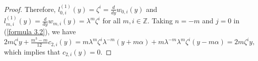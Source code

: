 \documentclass[12pt,reqno]{amsart}
\def\Z{\mathbb{Z}}
\numberwithin{equation}{section}
\begin{document}
\begin{proof}
Therefore, $l_{0,i}^{(1)}(y)=\zeta^i=\frac{d}{dy}w_{0,i}(y)$ and $l_{m,i}^{(1)}(y)=\frac{d}{dy}w_{m,i}(y)=\lambda^m\zeta^i$ for all $m,i\in\Z$. Taking $n=-m$ and $j=0$ in (\ref{formula 3.2}), we have $2m\zeta^iy+\frac{m^3-m}{12}c_{2,i}(y)=m\lambda^m\zeta^i\lambda^{-m}(y+m\alpha)+m\lambda^{-m}\lambda^{m}\zeta^i(y-m\alpha)
=2m\zeta^iy,$
which implies that $c_{2,i}(y)=0$.
\end{proof}
\end{document}
